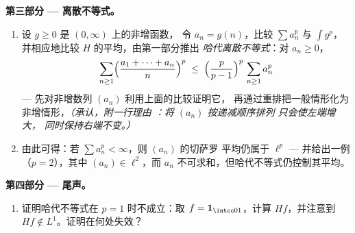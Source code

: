 \begin{problem}
\medskip
\noindent\textbf{第三部分 --- 离散不等式。}
\begin{enumerate}[resume]
  \item 设 $g \geq 0$ 是 $(0,\infty)$ 上的非增函数，
        令 $a_n = g(n)$，比较 $\sum a_n^p$ 与 $\int g^p$，
        并相应地比较 $H$ 的平均，由第一部分推出
        \emph{哈代离散不等式}：对 $a_n \geq 0$，
        \[
        \sum_{n\geq1}\Bigl(\frac{a_1 + \dots +
        a_n}{n}\Bigr)^{p}
        \;\leq\;
        \Bigl(\frac{p}{p-1}\Bigr)^{p}\,\sum_{n\geq1}a_n^p
        \]
        --- 先对非增数列 $(a_n)$ 利用上面的比较证明它，
        再通过重排把一般情形化为
        非增情形，\emph{（承认，附一行理由
        ：将 $(a_n)$ 按递减顺序排列
        只会使左端增大，
        同时保持右端不变。）}
  \item 由此可得：若 $\sum a_n^p < \infty$，则 $(a_n)$ 的切萨罗
        平均仍属于 $\ell^p$ --- 并给出一例
        （$p = 2$），其中 $(a_n) \in \ell^2$，而 $a_n$
        不可求和，但哈代不等式仍控制其平均。
\end{enumerate}

\medskip
\noindent\textbf{第四部分 --- 尾声。}
\begin{enumerate}[resume]
  \item 证明哈代不等式在 $p = 1$ 时不成立：取
        $f = \mathbf 1_{\intcc01}$，计算 $Hf$，并注意到
        $Hf \notin L^1$。证明在何处失效？
\end{enumerate}


\end{problem}
